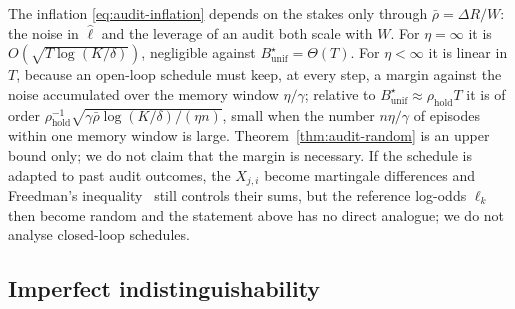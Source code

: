 \begin{remark}\label{rem:audit-random}
The inflation \eqref{eq:audit-inflation} depends on the stakes only through
$\bar\rho=\Delta R/W$: the noise in $\hat\ell$ and the leverage of an audit both
scale with $W$. For $\eta=\infty$ it is $O(\sqrt{T\log(K/\delta)})$, negligible
against $B^\star_{\mathrm{unif}}=\Theta(T)$. For $\eta<\infty$ it is linear in
$T$, because an open-loop schedule must keep, at every step, a margin against
the noise accumulated over the memory window $\eta/\gamma$; relative to
$B^\star_{\mathrm{unif}}\approx\rho_{\mathrm{hold}}T$ it is of order
$\rho_{\mathrm{hold}}^{-1}\sqrt{\gamma\bar\rho\log(K/\delta)/(\eta n)}$, small
when the number $n\eta/\gamma$ of episodes within one memory window is large.
Theorem~\ref{thm:audit-random} is an upper bound only; we do not claim that the
margin is necessary. If the schedule is adapted to past audit outcomes, the
$X_{j,i}$ become martingale differences and Freedman's
inequality~\cite{freedman1975tail} still controls their sums, but the reference log-odds $\ell_k$ then become random and the statement above has no direct analogue; we do not analyse closed-loop schedules.
\end{remark}

\subsection{Imperfect indistinguishability}

